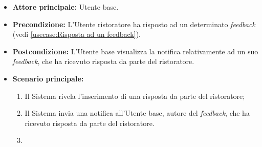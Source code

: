 \label{usecase:Visualizzazione notifica risposta feedback}
\begin{itemize}
	\item \textbf{Attore principale:} Utente base.
	
	\item \textbf{Precondizione:} L'Utente ristoratore ha risposto ad un determinato \textit{feedback} (vedi \autoref{usecase:Risposta ad un feedback}).

    
	\item \textbf{Postcondizione:} L'Utente base visualizza la notifica relativamente ad un suo \textit{feedback}, che ha ricevuto risposta da parte del ristoratore.
     
	\item \textbf{Scenario principale:}
	      \begin{enumerate}
                \item Il Sistema rivela l'inserimento di una risposta da parte del ristoratore;
                \item Il Sistema invia una notifica all'Utente base, autore del \textit{feedback}, che ha ricevuto risposta da parte del ristoratore.
                \item 
	      \end{enumerate}
\end{itemize}